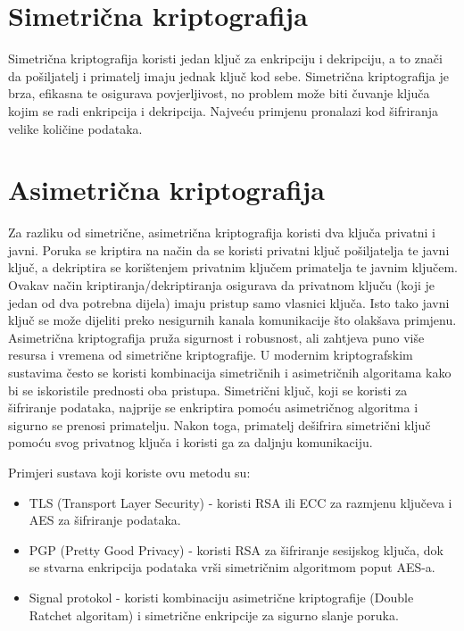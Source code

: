 \documentclass[]{foi}
\begin{document}
\section{Simetrična kriptografija}

Simetrična kriptografija koristi jedan ključ za enkripciju i dekripciju, a to znači da pošiljatelj i primatelj imaju jednak ključ kod sebe. Simetrična kriptografija je brza, efikasna te osigurava povjerljivost, no problem može biti čuvanje ključa kojim se radi enkripcija i dekripcija. Najveću primjenu pronalazi kod šifriranja velike količine podataka.


\section{Asimetrična kriptografija}

Za razliku od simetrične, asimetrična kriptografija koristi dva ključa privatni i javni.
Poruka se kriptira na način da se koristi privatni ključ pošiljatelja te javni ključ, a dekriptira se korištenjem privatnim ključem primatelja te javnim ključem.
Ovakav način kriptiranja/dekriptiranja osigurava da privatnom ključu (koji je jedan od dva potrebna dijela) imaju pristup samo vlasnici ključa.
Isto tako javni ključ se može dijeliti preko nesigurnih kanala komunikacije što olakšava primjenu.
Asimetrična kriptografija pruža sigurnost i robusnost, ali zahtjeva puno više resursa i vremena od simetrične kriptografije.
U modernim kriptografskim sustavima često se koristi kombinacija simetričnih i asimetričnih algoritama kako bi se iskoristile prednosti oba pristupa. Simetrični ključ, koji se koristi za šifriranje podataka, najprije se enkriptira pomoću asimetričnog algoritma i sigurno se prenosi primatelju. Nakon toga, primatelj dešifrira simetrični ključ pomoću svog privatnog ključa i koristi ga za daljnju komunikaciju.

\noindent Primjeri sustava koji koriste ovu metodu su:
\begin{itemize}[noitemsep,topsep=0pt]
    \item TLS (Transport Layer Security) - koristi RSA ili ECC za razmjenu ključeva i AES za šifriranje podataka.
    \item PGP (Pretty Good Privacy) - koristi RSA za šifriranje sesijskog ključa, dok se stvarna enkripcija podataka vrši simetričnim algoritmom poput AES-a.
    \item Signal protokol - koristi kombinaciju asimetrične kriptografije (Double Ratchet algoritam) i simetrične enkripcije za sigurno slanje poruka.
\end{itemize}
\end{document}
